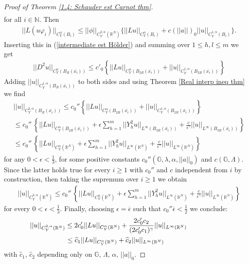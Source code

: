 \documentclass{article}
\numberwithin{equation}{section}
\begin{document}
\begin{proof}[Proof of Theorem \ref{1.4: Schauder est Carnot thm}]
\begin{align*}
    \end{align*}
    for all $i \in \mathbb{N}$. Then
    \begin{align*}
        & ||L(u \varphi_i)||_{C^{\alpha}_Y(B_i)} \leq ||\phi||_{C^{2,\alpha}_Y(\mathbb{R}^N)} \{ ||Lu||_{C^{\alpha}_Y(B_i)} + c(||a||)_0  ||u||_{C^{1,\alpha}_Y(B_i)} \}.
    \end{align*}
    Inserting this in (\ref{intermediate est Hölder}) and summing over $1 \leq h, l \leq m$ we get
    \begin{align*}
        & ||D^2 u||_{C^{\alpha}_Y(B_R(\overline{x_i}))} \leq c'_0 \left\{||Lu||_{C^{\alpha}_Y(B_{2R}(\overline{x_i}))} + ||u||_{C^{1,\alpha}_Y(B_{2R}(\overline{x_i}))} \right\}
    \end{align*}
    Adding $||u||_{C^{1,\alpha}_Y(B_{R}(\overline{x_i}))}$ to both sides and using Theorem \ref{Real interp ineq thm} we find
    \begin{align*}
        & ||u||_{C^{2,\alpha}_Y(B_R(\overline{x_i}))} \leq c_0'' \left\{ ||Lu||_{C^{\alpha}_Y(B_{2R}(\overline{x_i}))} + ||u||_{C^{1,\alpha}_Y(B_{2R}(\overline{x_i}))} \right\} \\
        & \leq c_0'' \, \left\{ ||Lu||_{C^{\alpha}_Y(B_{2R}(\overline{x_i}))} + \epsilon \sum_{h=1}^m ||Y_h^2 u||_{L^{\infty}(B_{3R}(\overline{x_i}))} + \frac{c}{\epsilon^{\gamma}} ||u||_{L^{\infty}(B_{3R}(\overline{x_i}))} \right\} \\
        & \leq c_0'' \, \left\{ ||Lu||_{C^{\alpha}_Y(
        \mathbb{R}^N)} + \epsilon \sum_{h=1}^m ||Y_h^2 u||_{L^{\infty}(\mathbb{R}^N)} + \frac{c}{\epsilon^{\gamma}} ||u||_{L^{\infty}(\mathbb{R}^N)} \right\}
    \end{align*}
    for any $0 < \epsilon < \frac{1}{3}$, for some positive constants $c_0''(\mathbb{G}, \lambda, \alpha, ||a||_0)$ and $c(\mathbb{G}, \Lambda)$.
    Since the latter holds true for every $i \geq 1$ with $c_0''$ and $c$ independent from $i$ by construction, then taking the supremum over $i \geq 1$ we obtain
    \begin{align*}
        & ||u||_{C^{2,\alpha}_Y(\mathbb{R}^N)} \leq c_0'' \, \left\{ ||Lu||_{C^{\alpha}_Y(
        \mathbb{R}^N)} + \epsilon \sum_{h=1}^m ||Y_h^2 u||_{L^{\infty}(\mathbb{R}^N)} + \frac{c}{\epsilon^{\gamma}} ||u||_{L^{\infty}(\mathbb{R}^N)} \right\}
    \end{align*}
    for every $0 < \epsilon < \frac{1}{3}$. Finally, choosing $\epsilon=\overline{\epsilon}$ such that $c_0'' \overline{\epsilon} < \frac{1}{2}$ we conclude:
    \begin{align*}
        & \hspace{-1.85cm} ||u||_{C^{2,\alpha}_Y(\mathbb{R}^N)} \leq 2c_0' ||Lu||_{C^{\alpha}_Y(\mathbb{R}^N)} + \frac{2c'_0 c_2}{(2c'_0 c_1)^{\gamma}} ||u||_{L^{\infty}(\mathbb{R}^N)} \\
        & \leq \widehat{c}_1 ||Lu||_{C^{\alpha}_Y(\mathbb{R}^N)} + \widehat{c}_2 ||u||_{L^{\infty}(\mathbb{R}^N)}
    \end{align*}
    with $\widehat{c}_1, \, \widehat{c}_2$ depending only on $\mathbb{G}, \, \Lambda,\,  \alpha, \, ||a||_0$.
\end{proof}
\end{document}
